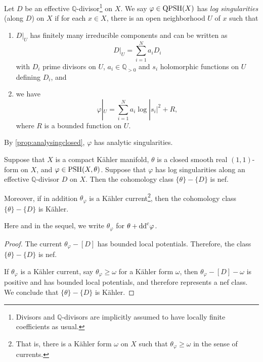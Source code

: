 \begin{definition}\label{def:pshfunctions:L1393}
    Let $D$ be an effective $\mathbb{Q}$-divisor\footnote{Divisors and $\mathbb{Q}$-divisors are implicitly assumed to have locally finite coefficients as usual.} on $X$.
    We say $\varphi\in \mathrm{QPSH}(X)$ has \emph{log singularities} (along $D$) on $X$ if for each $x\in X$, there is an open neighborhood $U$ of $x$ such that
    \begin{enumerate}
        \item\label{itm:chapter-pshfunctions:L1415:1} $D|_U$ has finitely many irreducible components and can be written as
        \[
            D|_U=\sum_{i=1}^N a_i D_i
        \]
        with $D_i$ prime divisors on $U$, $a_i\in \mathbb{Q}_{>0}$ and $s_i$ holomorphic functions on $U$ defining $D_i$, and
        \item\label{itm:chapter-pshfunctions:L1415:2} we have
        \begin{equation}\label{eq:logsingreminder}
            \varphi|_U=\sum_{i=1}^N a_i\log |s_i|^2+R,
        \end{equation}
        where $R$ is a bounded function on $U$.
    \end{enumerate}
\end{definition}
By \cref{prop:analysingclosed}, $\varphi$ has analytic singularities.

\begin{lemma}\label{lma:logsingrem}
    Suppose that $X$ is a compact Kähler manifold, $\theta$ is a closed smooth real $(1,1)$-form on $X$, and $\varphi\in \mathrm{PSH}(X,\theta)$. Suppose that $\varphi$ has log singularities along an effective $\mathbb{Q}$-divisor $D$ on $X$. Then the cohomology class $\{\theta\}-\{D\}$ is nef.

    Moreover, if in addition $\theta_{\varphi}$ is a Kähler current\footnote{That is, there is a K\"ahler form $\omega$ on $X$ such that $\theta_{\varphi}\geq \omega$ in the sense of currents.}, then the cohomology class $\{\theta\}-\{D\}$ is Kähler.
\end{lemma}
Here and in the sequel, we write $\theta_{\varphi}$ for $\theta+\mathrm{dd}^{\mathrm{c}}\varphi$.

\begin{proof}
    The current $\theta_{\varphi}-[D]$ has bounded local potentials. Therefore, the class $\{\theta\}-\{D\}$ is nef.

    If $\theta_{\varphi}$ is a Kähler current, say $\theta_{\varphi}\geq \omega$ for a Kähler form $\omega$, then $\theta_{\varphi}-[D]-\omega$ is positive and has bounded local potentials, and therefore represents a nef class. We conclude that $\{\theta\}-\{D\}$ is Kähler.
\end{proof}

